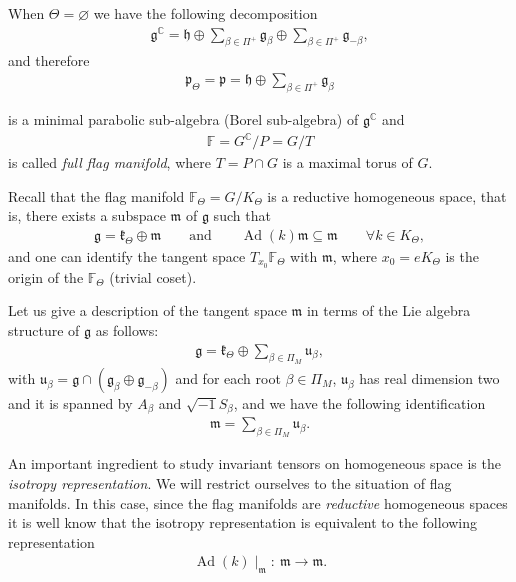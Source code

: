 \documentclass[pdftex]{sigma}%
\numberwithin{equation}{section}
\DeclareMathOperator{\Ad}{Ad}
\begin{document}
When $\Theta=\varnothing$ we have the following decomposition
\begin{gather*}
\mathfrak{g}^\mathbb{C}=\mathfrak{h}\oplus
\sum_{\beta\in \Pi^{+}}\mathfrak{g}_{\beta}\oplus
\sum_{\beta\in \Pi^{+}}\mathfrak{g}_{-\beta},
\end{gather*}
and therefore
\begin{gather*}
\mathfrak{p}_{\Theta}=\mathfrak{p}=\mathfrak{h}\oplus
\sum_{\beta\in \Pi^{+}}\mathfrak{g}_{\beta}
\end{gather*}
{\samepage
is a minimal parabolic sub-algebra (Borel sub-algebra) of $\mathfrak{g}^\mathbb{C}$ and
\begin{gather*}
\mathbb{F}=G^\mathbb{C}/P=G/T
\end{gather*}
is called {\it full flag manifold}, where $T=P\cap G$ is a maximal torus of $G$.

}

Recall that the flag manifold $\mathbb{F}_{\Theta}=G/K_{\Theta}$ is a reductive homogeneous space, that is, there exists a subspace $\mathfrak{m}$ of $\mathfrak{g}$ such that
\begin{gather*}
\mathfrak{g}=\mathfrak{k}_{\Theta}\oplus \mathfrak{m} \qquad \text{and} \qquad
\Ad(k)\mathfrak{m}\subseteq \mathfrak{m}\qquad \forall k\in K_{\Theta},
\end{gather*}
and one can identify the tangent space $T_{x_{0}}\mathbb{F}_{\Theta}$ with $\mathfrak{m}$, where $x_{0}=eK_{\Theta}$ is the origin of the $\mathbb{F}_{\Theta}$ (trivial coset).

Let us give a description of the tangent space $\mathfrak{m}$ in terms of the Lie algebra structure of $\mathfrak{g}$ as follows:
\begin{gather*}
\mathfrak{g}=\mathfrak{k}_{\Theta}\oplus\sum_{\beta\in \Pi_{M}}{\mathfrak{u}_{\beta}},
\end{gather*}
with $\mathfrak{u}_{\beta}=\mathfrak{g}\cap(\mathfrak{g}_{\beta}\oplus \mathfrak{g}_{-\beta})$ and for each root $\beta \in \Pi_{M}$, $\mathfrak{u}_{\beta}$ has real dimension two and it is spanned by $A_{\beta}$ and $\sqrt{-1}S_{\beta}$, and we have the following identification
\begin{gather*}
\mathfrak{m}=\sum_{\beta\in \Pi_{M}}\mathfrak{u}_{\beta}.
\end{gather*}

An important ingredient to study invariant tensors on homogeneous space is the {\em isotropy representation}. We will restrict ourselves to the situation of flag manifolds. In this case, since the flag manifolds are {\em reductive} homogeneous spaces it is well know that the isotropy representation is equivalent to the following representation
\begin{gather*}
\Ad(k)\mid_{\mathfrak{m}}\colon\ \mathfrak{m}\longrightarrow\mathfrak{m}.
\end{gather*}
\end{document}
